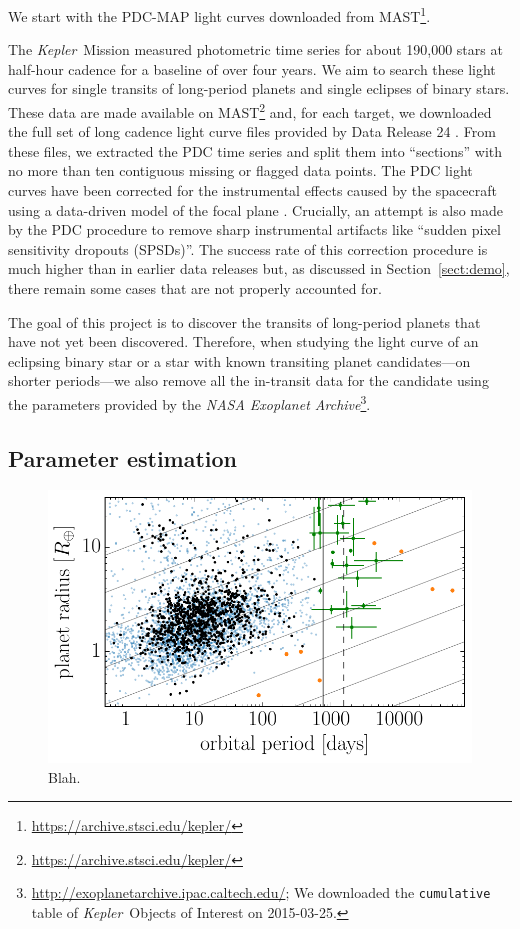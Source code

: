 \documentclass[onecolumn]{aastex6}
\newcommand{\project}[1]{\textsl{#1}}
\newcommand{\kepler}{\project{Kepler}}
\newcommand{\figlabel}[1]{\label{fig:#1}}
\newcommand{\sectionname}{Section}
\newcommand{\sectref}[1]{\ref{sect:#1}}
\newcommand{\Sect}[1]{\sectionname~\sectref{#1}}
\newcommand{\sect}[1]{\Sect{#1}}
\begin{document}
We start with the PDC-MAP light curves downloaded from
MAST\footnote{\url{https://archive.stsci.edu/kepler/}}.



The \kepler\ Mission measured photometric time series for about 190,000 stars
at half-hour cadence for a baseline of over four years.
We aim to search these light curves for single transits of long-period planets
and single eclipses of binary stars.
These data are made available on
MAST\footnote{\url{https://archive.stsci.edu/kepler/}} and, for each target,
we downloaded the full set of long cadence light curve files provided by Data
Release 24 \citep{Thompson:2015}.
From these files, we extracted the PDC time series and split them into
``sections'' with no more than ten contiguous missing or flagged data points.
The PDC light curves have been corrected for the instrumental effects caused
by the spacecraft using a data-driven model of the focal plane
\citep{Stumpe:2012, Smith:2012}.
Crucially, an attempt is also made by the PDC procedure to remove sharp
instrumental artifacts like ``sudden pixel sensitivity dropouts (SPSDs)''.
The success rate of this correction procedure is much higher than in earlier
data releases but, as discussed in \sect{demo}, there remain some cases that
are not properly accounted for.

The goal of this project is to discover the transits of long-period planets
that have not yet been discovered.
Therefore, when studying the light curve of an eclipsing binary star or a star
with known transiting planet candidates---on shorter periods---we also remove
all the in-transit data for the candidate using the parameters provided by the
\project{NASA Exoplanet
Archive}\footnote{\url{http://exoplanetarchive.ipac.caltech.edu/}; We
downloaded the \texttt{cumulative} table of \kepler\ Objects of Interest on
2015-03-25.}.


\subsection{Parameter estimation}


\begin{figure}
\begin{center}
\includegraphics{figures/full_sample.pdf}
\end{center}
\caption{%
Blah.
\figlabel{full-sample}}
\end{figure}
\end{document}
